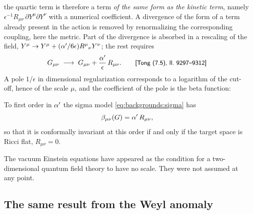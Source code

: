 the quartic term is therefore a term \emph{of the same form as the kinetic term}, namely
$\epsilon^{-1}R_{\mu\nu}\,\partial Y^\mu\partial Y^\nu$ with a numerical coefficient. A
divergence of the form of a term already present in the action is removed by renormalizing
the corresponding coupling, here the metric. Part of the divergence is absorbed in a
rescaling of the field, $Y^\mu\to Y^\mu+(\alpha'/6\epsilon)R^\mu{}_\nu Y^\nu$; the rest requires
\begin{equation}\label{eq:backgrounds:renorm}
  G_{\mu\nu}\;\longrightarrow\;G_{\mu\nu}+\frac{\alpha'}{\epsilon}\,R_{\mu\nu}.
  \qquad\text{{\small\textsf{[Tong (7.5), ll.~9297--9312]}}}
\end{equation}
A pole $1/\epsilon$ in dimensional regularization corresponds to a logarithm of the cut-off,
hence of the scale $\mu$, and the coefficient of the pole is the beta function:

\begin{proposition}\label{prop:backgrounds:ricci}
To first order in $\alpha'$ the sigma model \eqref{eq:backgrounds:sigma} has
\begin{equation}\label{eq:backgrounds:ricci}
  \beta_{\mu\nu}(G)=\alpha'\,R_{\mu\nu},
\end{equation}
so that it is conformally invariant at this order if and only if the target space is Ricci
flat, $R_{\mu\nu}=0$. 
\end{proposition}

The vacuum Einstein equations have appeared as the condition for a two-dimensional quantum
field theory to have no scale. They were not assumed at any point.

\subsection{The same result from the Weyl anomaly}

